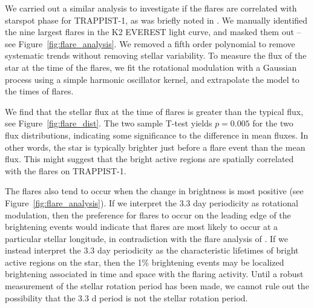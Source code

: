 We carried out a similar analysis to investigate if the flares are correlated with starspot phase for TRAPPIST-1, as was briefly noted in \citet{Vida2017}. We manually identified the nine largest flares in the K2 EVEREST light curve, and masked them out -- see Figure~\ref{fig:flare_analysis}. We removed a fifth order polynomial to remove systematic trends without removing stellar variability. To measure the flux of the star at the time of the flares, we fit the rotational modulation with a Gaussian process using a simple harmonic oscillator kernel, and extrapolate the model to the times of flares. 

We find that the stellar flux at the time of flares is greater than the typical flux, see Figure~\ref{fig:flare_dist}. The two sample T-test yields $p = 0.005$ for the two flux distributions, indicating some significance to the difference in mean fluxes. In other words, the star is typically brighter just before a flare event than the mean flux. This might suggest that the bright active regions are spatially correlated with the flares on TRAPPIST-1. 

The flares also tend to occur when the change in brightness is most positive (see Figure~\ref{fig:flare_analysis}). If we interpret the 3.3 day periodicity as rotational modulation, then the preference for flares to occur on the leading edge of the brightening events would indicate that flares are most likely to occur at a particular stellar longitude, in contradiction with the flare analysis of \citet{Vida2017}. If we instead interpret the 3.3 day periodicity as the characteristic lifetimes of bright active regions on the star, then the 1\% brightening events may be localized brightening associated in time and space with the flaring activity.  Until a robust measurement of the stellar rotation period has been made, we cannot rule out the possibility that the 3.3 d period is not the stellar rotation period. 


